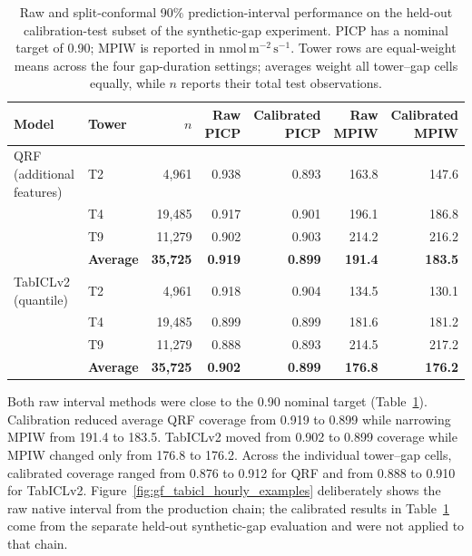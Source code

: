 \begin{table}[htbp]
\centering
\footnotesize
\begin{tabular*}{\textwidth}{@{\extracolsep{\fill}}llrrrrr@{}}
\toprule
Model & Tower & $n$ & \shortstack{Raw\\PICP} & \shortstack{Calibrated\\PICP} & \shortstack{Raw\\MPIW} & \shortstack{Calibrated\\MPIW} \\
\midrule
QRF (additional features) & T2 & 4,961 & 0.938 & 0.893 & 163.8 & 147.6 \\
 & T4 & 19,485 & 0.917 & 0.901 & 196.1 & 186.8 \\
 & T9 & 11,279 & 0.902 & 0.903 & 214.2 & 216.2 \\
 & \textbf{Average} & \textbf{35,725} & \textbf{0.919} & \textbf{0.899} & \textbf{191.4} & \textbf{183.5} \\
\addlinespace[0.3em]
TabICLv2 (quantile) & T2 & 4,961 & 0.918 & 0.904 & 134.5 & 130.1 \\
 & T4 & 19,485 & 0.899 & 0.899 & 181.6 & 181.2 \\
 & T9 & 11,279 & 0.888 & 0.893 & 214.5 & 217.2 \\
 & \textbf{Average} & \textbf{35,725} & \textbf{0.902} & \textbf{0.899} & \textbf{176.8} & \textbf{176.2} \\
\bottomrule
\end{tabular*}
\caption{Raw and split-conformal 90\% prediction-interval performance on the
held-out calibration-test subset of the synthetic-gap experiment. PICP has a
nominal target of 0.90; MPIW is reported in
\(\mathrm{nmol\,m^{-2}\,s^{-1}}\). Tower rows are equal-weight means across
the four gap-duration settings; averages weight all tower--gap cells
equally, while \(n\) reports their total test observations.}
\label{tab:gf_uq_calibration}
\end{table}

\FloatBarrier

Both raw interval methods were close to the 0.90 nominal target
(Table~\ref{tab:gf_uq_calibration}). Calibration reduced average QRF
coverage from 0.919 to 0.899 while narrowing MPIW from 191.4 to 183.5.
TabICLv2 moved from 0.902 to 0.899 coverage while MPIW changed only from 176.8
to 176.2. Across the
individual tower--gap cells, calibrated coverage ranged from 0.876 to 0.912
for QRF and from 0.888 to 0.910 for TabICLv2. Figure~\ref{fig:gf_tabicl_hourly_examples}
deliberately shows the raw native interval from the production chain; the
calibrated results in Table~\ref{tab:gf_uq_calibration} come from the separate
held-out synthetic-gap evaluation and were not applied to that chain.

